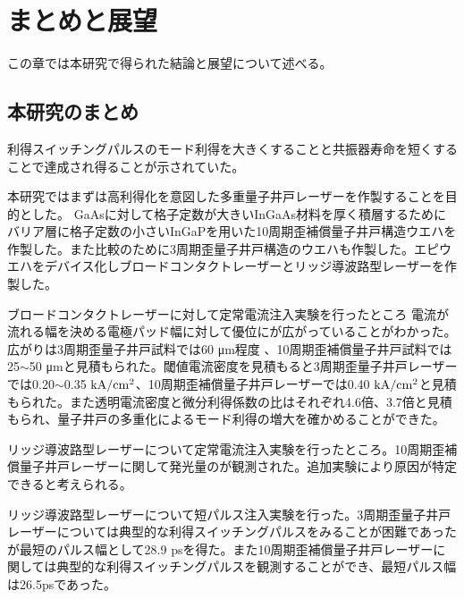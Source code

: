 
\chapter{まとめと展望}
この章では本研究で得られた結論と展望について述べる。
\section{本研究のまとめ}%


利得スイッチングパルスのモード利得を大きくすることと共振器寿命を短くすることで達成され得ることが示されていた。


本研究ではまずは高利得化を意図した多重量子井戸レーザーを作製することを目的とした。
GaAsに対して格子定数が大きいInGaAs材料を厚く積層するためにバリア層に格子定数の小さいInGaPを用いた10周期歪補償量子井戸構造ウエハを作製した。また比較のために3周期歪量子井戸構造のウエハも作製した。エピウエハをデバイス化しブロードコンタクトレーザーとリッジ導波路型レーザーを作製した。


ブロードコンタクトレーザーに対して定常電流注入実験を行ったところ
電流が流れる幅を決める電極パッド幅に対して優位にが広がっていることがわかった。広がりは3周期歪量子井戸試料では60 \si{\micro\metre}程度
、10周期歪補償量子井戸試料では25$\sim$50 \si{\micro\metre}と見積もられた。閾値電流密度を見積もると3周期歪量子井戸レーザーでは0.20$\sim$0.35 $\rm{kA/cm^{2}}$、10周期歪補償量子井戸レーザーでは0.40 $\rm{kA/cm^2}$と見積もられた。また透明電流密度と微分利得係数の比はそれぞれ4.6倍、3.7倍と見積もられ、量子井戸の多重化によるモード利得の増大を確かめることができた。

リッジ導波路型レーザーについて定常電流注入実験を行ったところ。10周期歪補償量子井戸レーザーに関して発光量のが観測された。追加実験により原因が特定できると考えられる。


リッジ導波路型レーザーについて短パルス注入実験を行った。3周期歪量子井戸レーザーについては典型的な利得スイッチングパルスをみることが困難であったが最短のパルス幅として28.9 psを得た。また10周期歪補償量子井戸レーザーに関しては典型的な利得スイッチングパルスを観測することができ、最短パルス幅は26.5psであった。

